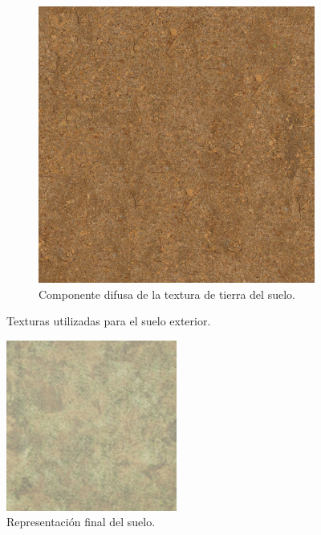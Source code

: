 \begin{figure}[H]
\begin{subfigure}[t]{0.48\textwidth}
        \includegraphics[width=\textwidth]{imagenes/converted/Ground066_2K_Color.jpg}
        \caption{Componente difusa de la textura de tierra del suelo.}
        \label{fig:ground066}
    \end{subfigure}    
    \caption{Texturas utilizadas para el suelo exterior.}
    \label{fig:exterior}
\end{figure}

\begin{figure}[H]
    \centering
    \includegraphics[width=0.5\textwidth]{imagenes/converted/sueloTextFinal}
    \caption{Representación final del suelo.}
    \label{fig:sueloFinal}
\end{figure}

